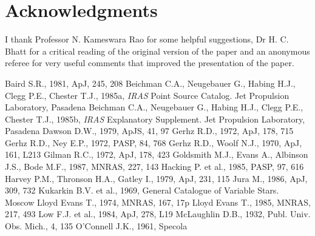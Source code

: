 \documentclass[useAMS,usenatbib]{mn2e}
\begin{document}
\section*{Acknowledgments}

I thank Professor N. Kameswara Rao for some helpful suggestions,
Dr H. C. Bhatt for a critical reading of the original version of the
paper and an anonymous referee for very useful comments that improved
the presentation of the paper.


\begin{thebibliography}{99}
 Baird S.R., 1981,
ApJ, 245, 208
 Beichman
C.A., Neugebauer G., Habing H.J., Clegg P.E., Chester T.J., 1985a,
{\it IRAS\/} Point Source Catalog. Jet Propulsion Laboratory,
Pasadena
 Beichman
C.A., Neugebauer G., Habing H.J., Clegg P.E., Chester T.J., 1985b,
{\it IRAS\/} Explanatory Supplement. Jet Propulsion Laboratory,
Pasadena
 Dawson D.W., 1979,
ApJS, 41, 97
 Gerhz R.D., 1972, ApJ,
178, 715
 Gerhz R.D., Ney
E.P., 1972, PASP, 84, 768
 Gerhz R.D., Woolf N.J.,
1970, ApJ, 161, L213
 Gilman R.C., 1972, ApJ, 178, 423
 Goldsmith M.J., Evans A.,
Albinson J.S., Bode M.F., 1987, MNRAS, 227, 143
 Hacking P. et al., 1985,
PASP, 97, 616
Harvey P.M., Thronson H.A., Gatley I., 1979, ApJ, 231, 115
 Jura M., 1986, ApJ, 309, 732
 Kukarkin B.V. et al.,
1969, General Catalogue of Variable Stars. Moscow
 Lloyd Evans T., 1974, MNRAS,
167, 17{\sc p}
 Lloyd Evans T., 1985, MNRAS,
217, 493
 Low F.J. et al., 1984, ApJ,
278, L19
 McLaughlin D.B., 1932, Publ. Univ.
Obs. Mich., 4, 135
 O'Connell J.K., 1961, Specola

\end{thebibliography}
\end{document}
